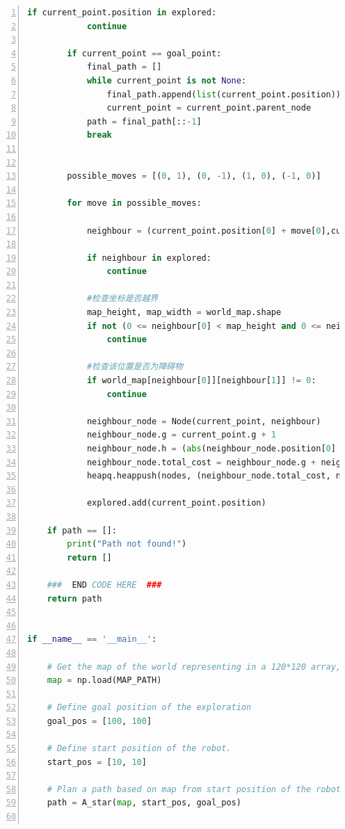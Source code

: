 \documentclass[aps,letterpaper,10pt]{revtex4}
\begin{document}
\begin{lstlisting}[language=Python, caption={Source Code for Task 1 (5-Task\_1.py)}, label={lst:task1_code}, basicstyle=\ttfamily\small, numbers=left, frame=tb, breaklines=true]
        if current_point.position in explored:
            continue
        
        if current_point == goal_point:
            final_path = []
            while current_point is not None:
                final_path.append(list(current_point.position))
                current_point = current_point.parent_node
            path = final_path[::-1]
            break


        possible_moves = [(0, 1), (0, -1), (1, 0), (-1, 0)]
        
        for move in possible_moves:
            
            neighbour = (current_point.position[0] + move[0],current_point.position[1] + move[1])

            if neighbour in explored:
                continue

            #检查坐标是否越界
            map_height, map_width = world_map.shape
            if not (0 <= neighbour[0] < map_height and 0 <= neighbour[1] < map_width):
                continue
            
            #检查该位置是否为障碍物
            if world_map[neighbour[0]][neighbour[1]] != 0:
                continue
            
            neighbour_node = Node(current_point, neighbour)
            neighbour_node.g = current_point.g + 1
            neighbour_node.h = (abs(neighbour_node.position[0] - goal_point.position[0]) + abs(neighbour_node.position[1] - goal_point.position[1]))
            neighbour_node.total_cost = neighbour_node.g + neighbour_node.h
            heapq.heappush(nodes, (neighbour_node.total_cost, neighbour_node))

            explored.add(current_point.position)

    if path == []:
        print("Path not found!")
        return []

    ###  END CODE HERE  ###
    return path


if __name__ == '__main__':

    # Get the map of the world representing in a 120*120 array, where 0 indicating traversable and 1 indicating obstacles.
    map = np.load(MAP_PATH)

    # Define goal position of the exploration
    goal_pos = [100, 100]

    # Define start position of the robot.
    start_pos = [10, 10]

    # Plan a path based on map from start position of the robot to the goal.
    path = A_star(map, start_pos, goal_pos)


\end{lstlisting}
\end{document}

